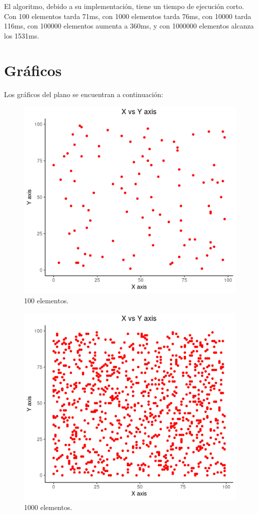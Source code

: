 \documentclass[paper=a4, fontsize=11pt]{scrartcl} %
\numberwithin{equation}{section} %
\numberwithin{figure}{section} %
\numberwithin{table}{section} %
\begin{document}
El algoritmo, debido a su implementación, tiene un tiempo de ejecución corto. Con 100 elementos
tarda 71ms, con 1000 elementos tarda 76ms, con 10000 tarda 116ms, con 100000 elementos
aumenta a 360ms, y con 1000000 elementos alcanza los 1531ms.

\section{Gráficos}\label{sec:gráficos}

Los gráficos del plano se encuentran a continuación:

\begin{figure}
    \includegraphics[width=\linewidth]{Rplot1.png}
    \caption{100 elementos.}
\end{figure}



\begin{figure}
    \includegraphics[width=\linewidth]{Rplot2.png}
    \caption{1000 elementos.}
\end{figure}
\end{document}
